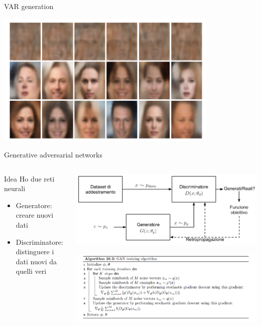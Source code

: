 \documentclass[11pt]{beamer}
\begin{document}
\begin{frame}{VAR generation \cite{pml1Book,pml2Book}}
\begin{center}
\includegraphics[width=0.8\textwidth]{Pic/var_generation.png}
\end{center}
\end{frame}

\begin{frame}{Generative adversarial networks \cite{pml1Book,pml2Book}}
\begin{columns}
\begin{column}{0.5\textwidth}
\begin{alertblock}{Idea}
Ho due reti neurali
\begin{itemize}
\item Generatore: creare nuovi dati
\item Discriminatore: distinguere i dati nuovi da quelli veri
\end{itemize}
\end{alertblock}
\end{column}
\begin{column}{0.4\textwidth}  
\begin{center}
\includegraphics[width=\textwidth]{Pic/GAN.png}
\end{center}
\begin{center}
\includegraphics[width=\textwidth]{Pic/algorithm_GAN.png}
\end{center}
\end{column}
\end{columns}
\end{frame}
\end{document}
